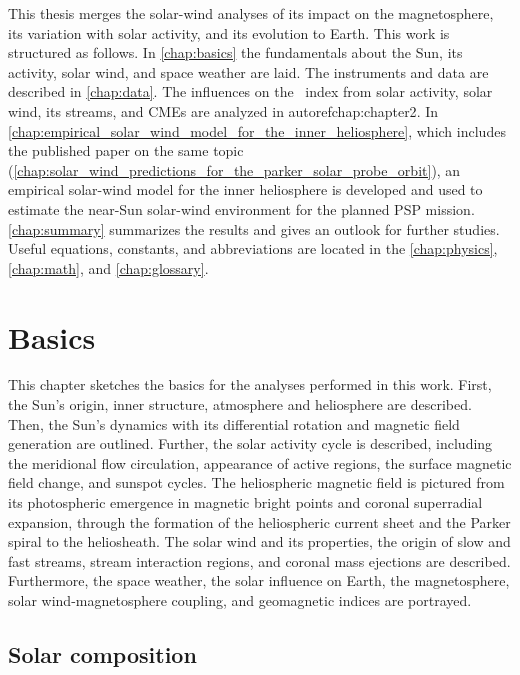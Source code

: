 This thesis merges the solar-wind analyses of its impact on the magnetosphere, its variation with solar activity, and its evolution to Earth. This work is structured as follows. In \autoref{chap:basics} the fundamentals about the Sun, its activity, solar wind, and space weather are laid. The instruments and data are described in \autoref{chap:data}. The influences on the \Kp{}~index from solar activity, solar wind, its streams, and CMEs are analyzed in autoref{chap:chapter2}. In \autoref{chap:empirical_solar_wind_model_for_the_inner_heliosphere}, which includes the published paper on the same topic (\autoref{chap:solar_wind_predictions_for_the_parker_solar_probe_orbit}), an empirical solar-wind model for the inner heliosphere is developed and used to estimate the near-Sun solar-wind environment for the planned PSP mission. \autoref{chap:summary} summarizes the results and gives an outlook for further studies. Useful equations, constants, and abbreviations are located in the \autoref{chap:physics}, \ref{chap:math}, and \ref{chap:glossary}.


\chapter{Basics}
\label{chap:basics}
This chapter sketches the basics for the analyses performed in this work. First, the Sun's origin, inner structure, atmosphere and heliosphere are described. Then, the Sun's dynamics with its differential rotation and magnetic field generation are outlined. Further, the solar activity cycle is described, including the meridional flow circulation, appearance of active regions, the surface magnetic field change, and sunspot cycles. The heliospheric magnetic field is pictured from its photospheric emergence in magnetic bright points and coronal superradial expansion, through the formation of the heliospheric current sheet and the Parker spiral to the heliosheath. The solar wind and its properties, the origin of slow and fast streams, stream interaction regions, and coronal mass ejections are described. Furthermore, the space weather, the solar influence on Earth, the magnetosphere, solar wind-magnetosphere coupling, and geomagnetic indices are portrayed.


\section{Solar composition}
\label{sec:solar_composition}

